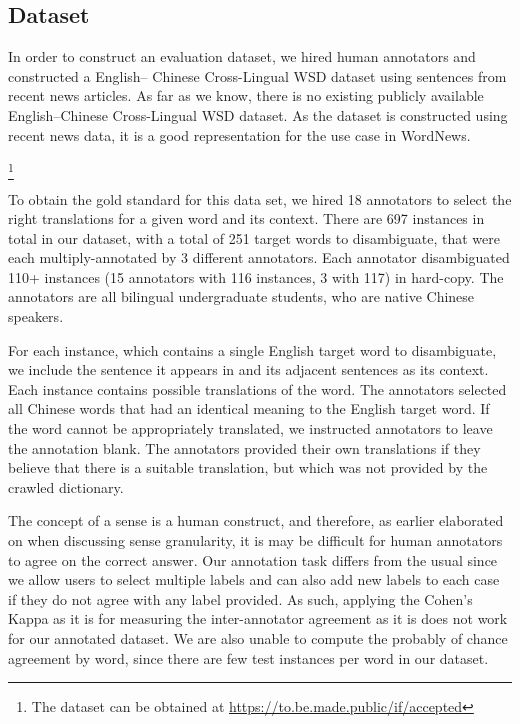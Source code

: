 \subsection{Dataset}
In order to construct an evaluation dataset, we hired human annotators and constructed a English--
Chinese Cross-Lingual WSD dataset using sentences from recent news articles. As far as we know, there 
is no existing publicly available English--Chinese Cross-Lingual WSD dataset. As the dataset is 
constructed using recent news data, it is a good representation for the use case in WordNews.{\footnote{The dataset can be obtained at %
{\url{https://to.be.made.public/if/accepted}}}

To obtain the gold standard for this data set, we hired 18 annotators to select the right translations for a given word and its context. There are 697 instances in total in our dataset, with a total of 251 target words to disambiguate, that were each multiply-annotated by 3 different annotators. Each annotator disambiguated 110+ instances (15 annotators with 116 instances, 3 with 117) in hard-copy. The annotators are all bilingual undergraduate students, who are native Chinese speakers. 

For each instance, which contains a single English target word to disambiguate, we include the sentence it appears in and its adjacent sentences as its context. Each instance contains possible translations of the word. 
The annotators selected all Chinese words that had an identical meaning to the English target word. If the word cannot be appropriately translated, we instructed annotators to leave the annotation blank. The annotators provided their own translations if they believe that there is a suitable translation, but which was not provided by the crawled dictionary. 

The concept of a sense is a human construct, and therefore, as earlier elaborated on when discussing sense granularity, it is %
may be difficult for human annotators to agree on the correct answer. 
Our annotation task differs from the usual since we allow users to select multiple labels and can also add new labels to each case if they do not agree with any label provided. As such, applying the Cohen's Kappa as it is for measuring the inter-annotator agreement as it is does not work for our annotated dataset. %
We are also unable to compute the probably of chance agreement by word, since there are few test instances per word in our dataset.

}
